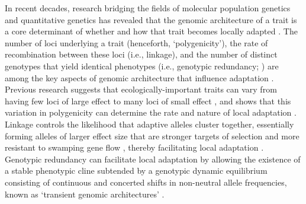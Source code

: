 \documentclass[9pt,twocolumn,twoside,lineno]{new_article}
\begin{document}
In recent decades, research bridging the fields
of molecular population genetics
and quantitative genetics
\cite{barghi_polygenic,barton,pritchard_human_adaptation,pritchard_sweeps_alone}
has revealed that the genomic architecture of a trait
is a core determinant of whether and how that trait
becomes locally adapted \cite{yeaman_review}.
The number of loci underlying a trait (henceforth, `polygenicity'),
the rate of recombination between these loci (i.e., linkage),
and the number of distinct genotypes that yield identical phenotypes
(i.e., genotypic redundancy; \cite{yeaman_review,laruson,barghi_polygenic})
are among the key aspects of genomic architecture that influence adaptation
\cite{barton,yeaman_whitlock,yeaman_review,lecorre}.
Previous research suggests that ecologically-important traits can vary from having
few loci of large effect \cite{martin,rees}
to many loci of small effect \cite{boyle,rockman,savolainen,sella,barghi_polygenic},
and shows that this variation in polygenicity can
determine the rate and nature of local adaptation \cite{yeaman_amnat}. 
Linkage controls the likelihood that adaptive alleles cluster together,
essentially forming alleles of larger effect size that are stronger 
targets of selection and more resistant
to swamping gene flow \cite{yeaman_whitlock},
thereby facilitating local adaptation \cite{tigano}.
Genotypic redundancy can facilitate local adaptation 
by allowing the existence of a stable phenotypic cline
subtended by a genotypic dynamic equilibrium
consisting of continuous and concerted shifts in non-neutral allele frequencies, known as `transient 
genomic architectures' \cite{barghi_redundancy,manceau,yeaman_amnat}.
\end{document}
